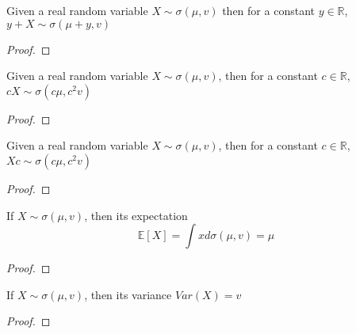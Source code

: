 \begin{lemma}
  \label{lem:semicircleReal_const_add}
  \mathlibok
  Given a real random variable $X \sim \sigma(\mu, v)$
  then for a constant $y \in \mathbb{R}$, $y + X \sim \sigma(\mu + y, v)$
  \begin{proof}

  \end{proof}
\end{lemma}


\begin{lemma}
  \label{lem:semicircleReal_const_mul}
  \mathlibok
  Given a real random variable $X \sim \sigma(\mu, v)$,
  then for a constant $c \in \mathbb{R}$, $cX \sim \sigma(c\mu , c^2v)$
  \begin{proof}

  \end{proof}
\end{lemma}


\begin{lemma}
  \label{lem:semicircleReal_mul_const}
  \mathlibok
   Given a real random variable $X \sim \sigma(\mu, v)$,
  then for a constant $c \in \mathbb{R}$, $Xc \sim \sigma(c \mu  , c^2v)$
  \begin{proof}

  \end{proof}
\end{lemma}




\begin{lemma}
  \label{lem:integral_id_semicircleReal}
  \notready
  If $X \sim \sigma(\mu, v)$, then its expectation $$\mathbb{E}[X] = \int x d \sigma(\mu, v) = \mu$$
  \begin{proof}
  \end{proof}
\end{lemma}

\begin{lemma}
  \label{lem:variance_fun_id_semicircleReal}
  \notready
  If $X \sim \sigma(\mu, v)$, then its variance $Var(X) = v$
  \begin{proof}
  \end{proof}
\end{lemma}


